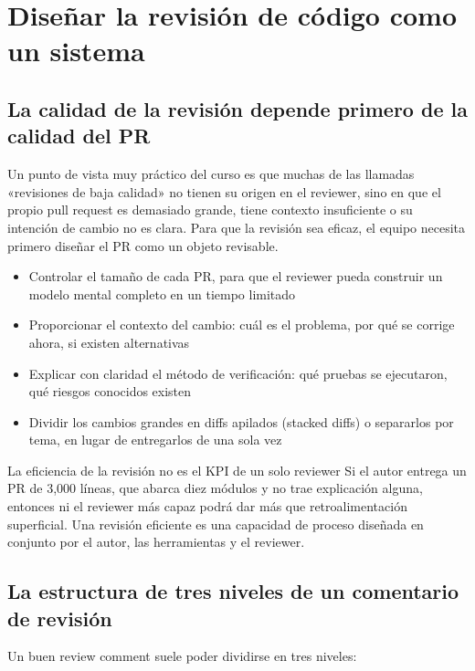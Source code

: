 \section{Diseñar la revisión de código como un sistema}

\subsection{La calidad de la revisión depende primero de la calidad del PR}

Un punto de vista muy práctico del curso es que muchas de las llamadas «revisiones de baja calidad» no tienen su origen en el reviewer, sino en que el propio pull request es demasiado grande, tiene contexto insuficiente o su intención de cambio no es clara. Para que la revisión sea eficaz, el equipo necesita primero diseñar el PR como un objeto revisable.

\begin{itemize}
    \item Controlar el tamaño de cada PR, para que el reviewer pueda construir un modelo mental completo en un tiempo limitado
    \item Proporcionar el contexto del cambio: cuál es el problema, por qué se corrige ahora, si existen alternativas
    \item Explicar con claridad el método de verificación: qué pruebas se ejecutaron, qué riesgos conocidos existen
    \item Dividir los cambios grandes en diffs apilados (stacked diffs) o separarlos por tema, en lugar de entregarlos de una sola vez
\end{itemize}

\begin{importantbox}{La eficiencia de la revisión no es el KPI de un solo reviewer}
Si el autor entrega un PR de 3,000 líneas, que abarca diez módulos y no trae explicación alguna, entonces ni el reviewer más capaz podrá dar más que retroalimentación superficial. Una revisión eficiente es una capacidad de proceso diseñada en conjunto por el autor, las herramientas y el reviewer.
\end{importantbox}

\subsection{La estructura de tres niveles de un comentario de revisión}

Un buen review comment suele poder dividirse en tres niveles:

